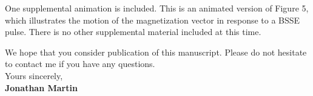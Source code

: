 \documentclass[11pt]{article}
\begin{document}
One supplemental animation is included. This is an animated version of Figure 5, which illustrates the motion of the magnetization vector in response to a BSSE pulse. There is no other supplemental material included at this time. 

\par We hope that you consider publication of this manuscript.
Please do not hesitate to contact me if you have any questions.\\[1.5em]
% 
Yours sincerely,\\[2em] %
%
{\bfseries Jonathan Martin}\\
%
\vfill%
\end{document}

